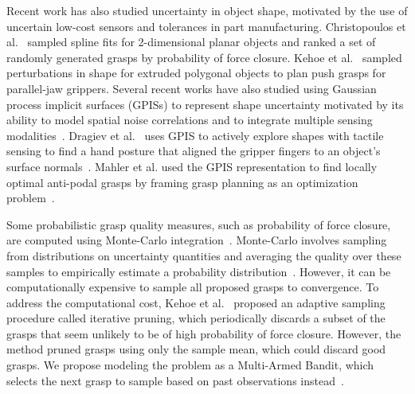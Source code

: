 \documentclass[10pt, conference]{ieeeconf}      %
\begin{document}
Recent work has also studied uncertainty in object shape, motivated by the use of uncertain low-cost sensors and tolerances in part manufacturing.
Christopoulos et al.~\cite{christopoulos2007handling} sampled spline fits for 2-dimensional planar objects and ranked a set of randomly generated grasps by probability of force closure.
Kehoe et al.~\cite{kehoe2012estimating, kehoe2012toward} sampled perturbations in shape for extruded polygonal objects to plan push grasps for parallel-jaw grippers.
Several recent works have also studied using Gaussian process implicit surfaces (GPISs) to represent shape uncertainty motivated by its ability to model spatial noise correlations and to integrate multiple sensing modalities~\cite{dragiev2011, dragiev2013uncertainty, hollinger2013, mahler2015gp}.
Dragiev et al.~\cite{dragiev2011} uses GPIS to actively explore shapes with tactile sensing to find a hand posture that aligned the gripper fingers to an object's surface normals~\cite{dragiev2013uncertainty}.
Mahler et al. used the GPIS representation to find locally optimal anti-podal grasps by framing grasp planning as an optimization problem~\cite{mahler2015gp}. 






Some probabilistic grasp quality measures, such as probability of force closure, are computed using Monte-Carlo integration~\cite{christopoulos2007handling, kim2012physically, weisz2012pose, kehoe2012toward}.
Monte-Carlo involves sampling from distributions on uncertainty quantities and averaging the quality over these samples to empirically estimate a probability distribution~\cite{caflisch1998monte}.
However, it can be computationally expensive to sample all proposed grasps to convergence.
To address the computational cost, Kehoe et al.~\cite{kehoe2012estimating} proposed an adaptive sampling procedure called iterative pruning, which periodically discards a subset of the grasps that seem unlikely to be of high probability of force closure. However, the method pruned grasps using only the sample mean, which could discard good grasps.
We propose modeling the problem as a Multi-Armed Bandit, which selects the next grasp to sample based on past observations instead~\cite{barto1998reinforcement, lai1985asymptotically}.
\end{document}
